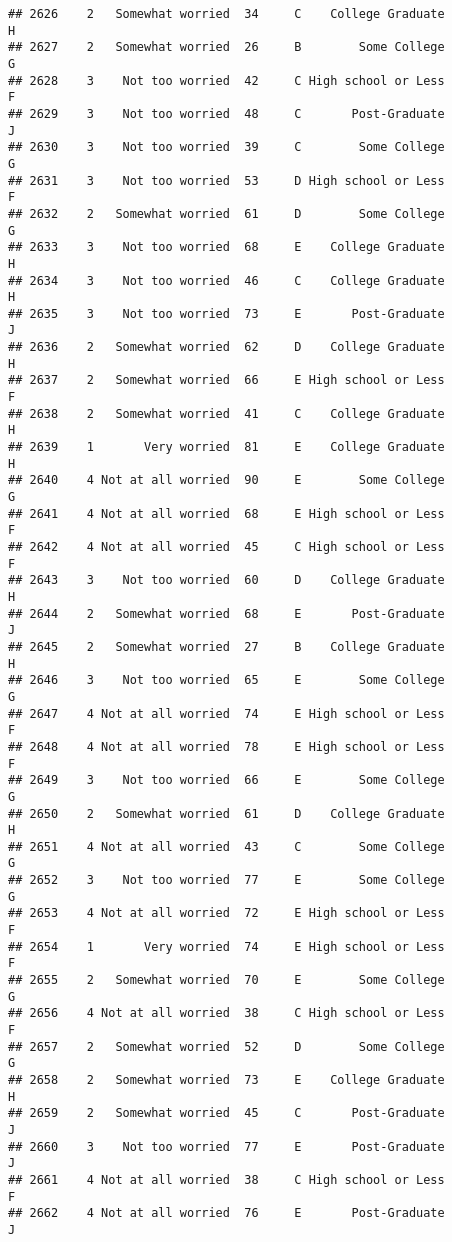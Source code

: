 \documentclass[
]{article}
\begin{document}
\begin{verbatim}
## 2626    2   Somewhat worried  34     C    College Graduate         H
## 2627    2   Somewhat worried  26     B        Some College         G
## 2628    3    Not too worried  42     C High school or Less         F
## 2629    3    Not too worried  48     C       Post-Graduate         J
## 2630    3    Not too worried  39     C        Some College         G
## 2631    3    Not too worried  53     D High school or Less         F
## 2632    2   Somewhat worried  61     D        Some College         G
## 2633    3    Not too worried  68     E    College Graduate         H
## 2634    3    Not too worried  46     C    College Graduate         H
## 2635    3    Not too worried  73     E       Post-Graduate         J
## 2636    2   Somewhat worried  62     D    College Graduate         H
## 2637    2   Somewhat worried  66     E High school or Less         F
## 2638    2   Somewhat worried  41     C    College Graduate         H
## 2639    1       Very worried  81     E    College Graduate         H
## 2640    4 Not at all worried  90     E        Some College         G
## 2641    4 Not at all worried  68     E High school or Less         F
## 2642    4 Not at all worried  45     C High school or Less         F
## 2643    3    Not too worried  60     D    College Graduate         H
## 2644    2   Somewhat worried  68     E       Post-Graduate         J
## 2645    2   Somewhat worried  27     B    College Graduate         H
## 2646    3    Not too worried  65     E        Some College         G
## 2647    4 Not at all worried  74     E High school or Less         F
## 2648    4 Not at all worried  78     E High school or Less         F
## 2649    3    Not too worried  66     E        Some College         G
## 2650    2   Somewhat worried  61     D    College Graduate         H
## 2651    4 Not at all worried  43     C        Some College         G
## 2652    3    Not too worried  77     E        Some College         G
## 2653    4 Not at all worried  72     E High school or Less         F
## 2654    1       Very worried  74     E High school or Less         F
## 2655    2   Somewhat worried  70     E        Some College         G
## 2656    4 Not at all worried  38     C High school or Less         F
## 2657    2   Somewhat worried  52     D        Some College         G
## 2658    2   Somewhat worried  73     E    College Graduate         H
## 2659    2   Somewhat worried  45     C       Post-Graduate         J
## 2660    3    Not too worried  77     E       Post-Graduate         J
## 2661    4 Not at all worried  38     C High school or Less         F
## 2662    4 Not at all worried  76     E       Post-Graduate         J

\end{verbatim}
\end{document}
